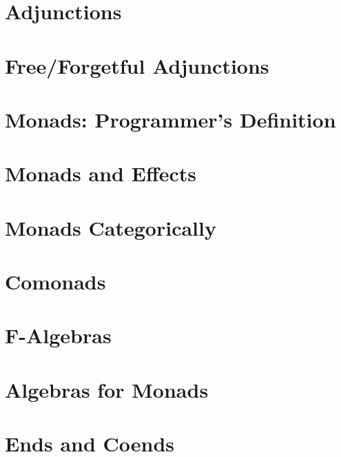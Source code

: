 \chapter{Adjunctions}\label{adjunctions}


\chapter{Free/Forgetful Adjunctions}\label{free-forgetful-adjunctions}


\chapter{Monads: Programmer's Definition}\label{monads-programmers-definition}


\chapter{Monads and Effects}\label{monads-and-effects}


\chapter{Monads Categorically}\label{monads-categorically}


\chapter{Comonads}\label{comonads}


\chapter{F-Algebras}\label{f-algebras}


\chapter{Algebras for Monads}\label{algebras-for-monads}


\chapter{Ends and Coends}\label{ends-and-coends}


